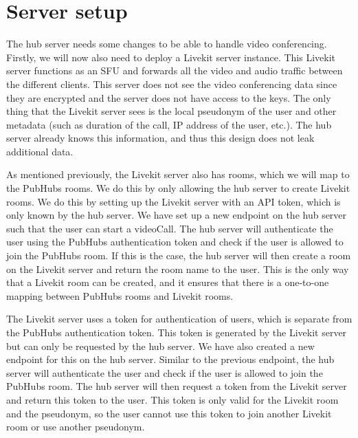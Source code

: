\documentclass{report}
\begin{document}
\section{Server setup}\label{sec:server-setup}
The hub server needs some changes to be able to handle video conferencing. Firstly, we will now also need to deploy a
Livekit server instance. This Livekit server functions as an SFU and forwards all the video and audio traffic
between the different clients. This server does not see the video conferencing data since they are
encrypted and the server does not have access to the keys. The only thing that the Livekit server sees is the local
pseudonym of the user and other metadata (such as duration of the call, IP address of the user, etc.). The hub
server already knows this information, and thus this design does not leak additional data.

As mentioned previously, the Livekit server also has rooms, which we will map to the PubHubs rooms. We do this by
only allowing the hub server to create Livekit rooms. We do this by setting up the Livekit server with an API token,
which is only known by the hub server. We have set up a new endpoint on the hub server such that the user can
start a videoCall. The hub server will authenticate the user using the PubHubs
authentication token and check if the user is allowed to join the PubHubs room. If this is the case, the hub server
will then create a room on the Livekit server and return the room name to the user. This is the only way that a Livekit
room can be created, and it ensures that there is a one-to-one mapping between PubHubs rooms and Livekit rooms.

The Livekit server uses a token for authentication of users, which is separate from the PubHubs authentication token.
This token is generated by the Livekit server but can only be requested by the hub server.
We have also created a new endpoint for this on the hub server. Similar to the previous endpoint, the hub server will
authenticate the user and check if the user is allowed to join the PubHubs room. The hub server will then request a
token from the Livekit server and return this token to the user. This token is only valid for the Livekit room and the
pseudonym, so the user cannot use this token to join another Livekit room or use another pseudonym.
\end{document}
